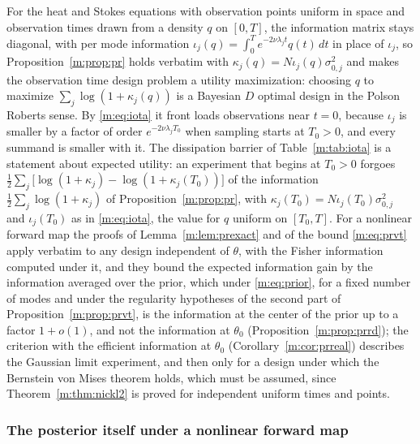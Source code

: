 \begin{remark}[Design]
For the heat and Stokes equations with observation points uniform in space and observation times drawn from a density $q$ on $[0,T]$, the information matrix stays diagonal, with per mode information $\iota_j(q)=\int_0^Te^{-2\nu\lambda_jt}q(t)\,dt$ in place of $\iota_j$, so Proposition~\ref{m:prop:pr} holds verbatim with $\kappa_j(q)=N\iota_j(q)\sigma^2_{0,j}$ and makes the observation time design problem a utility maximization: choosing $q$ to maximize $\sum_j\log(1+\kappa_j(q))$ is a Bayesian $D$ optimal design in the Polson Roberts sense. By \eqref{m:eq:iota} it front loads observations near $t=0$, because $\iota_j$ is smaller by a factor of order $e^{-2\nu\lambda_jT_0}$ when sampling starts at $T_0>0$, and every summand is smaller with it. The dissipation barrier of Table~\ref{m:tab:iota} is a statement about expected utility: an experiment that begins at $T_0>0$ forgoes $\tfrac12\sum_j\big[\log(1+\kappa_j)-\log(1+\kappa_j(T_0))\big]$ of the information $\tfrac12\sum_j\log(1+\kappa_j)$ of Proposition~\ref{m:prop:pr}, with $\kappa_j(T_0)=N\iota_j(T_0)\sigma^2_{0,j}$ and $\iota_j(T_0)$ as in \eqref{m:eq:iota}, the value for $q$ uniform on $[T_0,T]$. For a nonlinear forward map the proofs of Lemma~\ref{m:lem:prexact} and of the bound \eqref{m:eq:prvt} apply verbatim to any design independent of $\theta$, with the Fisher information computed under it, and they bound the expected information gain by the information averaged over the prior, which under \eqref{m:eq:prior}, for a fixed number of modes and under the regularity hypotheses of the second part of Proposition~\ref{m:prop:prvt}, is the information at the center of the prior up to a factor $1+o(1)$, and not the information at $\theta_0$ (Proposition~\ref{m:prop:prrd}); the criterion with the efficient information at $\theta_0$ (Corollary~\ref{m:cor:prreal}) describes the Gaussian limit experiment, and then only for a design under which the Bernstein von Mises theorem holds, which must be assumed, since Theorem~\ref{m:thm:nickl2} is proved for independent uniform times and points.
\end{remark}

\subsubsection{The posterior itself under a nonlinear forward map}

